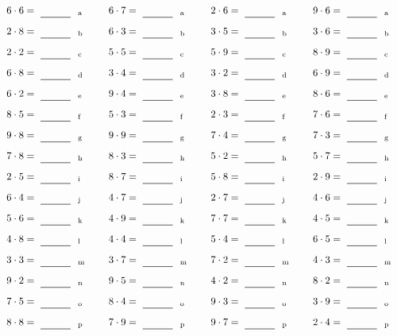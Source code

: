 \documentclass
[
  draft    = true,
  fontsize = 11pt,
  parskip  = half-
]
{scrartcl}
\begin{document}
\par\vfill\par
\begin{align*}
    \pline{6\cdot6}&=\rline{a}
  & \pline{6\cdot7}&=\rline{a}
  & \pline{2\cdot6}&=\rline{a}
  & \pline{9\cdot6}&=\rline{a} \\[1ex]
    \pline{2\cdot8}&=\rline{b}
  & \pline{6\cdot3}&=\rline{b}
  & \pline{3\cdot5}&=\rline{b}
  & \pline{3\cdot6}&=\rline{b} \\[1ex]
    \pline{2\cdot2}&=\rline{c}
  & \pline{5\cdot5}&=\rline{c}
  & \pline{5\cdot9}&=\rline{c}
  & \pline{8\cdot9}&=\rline{c} \\[1ex]
    \pline{6\cdot8}&=\rline{d}
  & \pline{3\cdot4}&=\rline{d}
  & \pline{3\cdot2}&=\rline{d}
  & \pline{6\cdot9}&=\rline{d} \\[1ex]
    \pline{6\cdot2}&=\rline{e}
  & \pline{9\cdot4}&=\rline{e}
  & \pline{3\cdot8}&=\rline{e}
  & \pline{8\cdot6}&=\rline{e} \\[1ex]
    \pline{8\cdot5}&=\rline{f}
  & \pline{5\cdot3}&=\rline{f}
  & \pline{2\cdot3}&=\rline{f}
  & \pline{7\cdot6}&=\rline{f} \\[1ex]
    \pline{9\cdot8}&=\rline{g}
  & \pline{9\cdot9}&=\rline{g}
  & \pline{7\cdot4}&=\rline{g}
  & \pline{7\cdot3}&=\rline{g} \\[1ex]
    \pline{7\cdot8}&=\rline{h}
  & \pline{8\cdot3}&=\rline{h}
  & \pline{5\cdot2}&=\rline{h}
  & \pline{5\cdot7}&=\rline{h} \\[1ex]
    \pline{2\cdot5}&=\rline{i}
  & \pline{8\cdot7}&=\rline{i}
  & \pline{5\cdot8}&=\rline{i}
  & \pline{2\cdot9}&=\rline{i} \\[1ex]
    \pline{6\cdot4}&=\rline{j}
  & \pline{4\cdot7}&=\rline{j}
  & \pline{2\cdot7}&=\rline{j}
  & \pline{4\cdot6}&=\rline{j} \\[1ex]
    \pline{5\cdot6}&=\rline{k}
  & \pline{4\cdot9}&=\rline{k}
  & \pline{7\cdot7}&=\rline{k}
  & \pline{4\cdot5}&=\rline{k} \\[1ex]
    \pline{4\cdot8}&=\rline{l}
  & \pline{4\cdot4}&=\rline{l}
  & \pline{5\cdot4}&=\rline{l}
  & \pline{6\cdot5}&=\rline{l} \\[1ex]
    \pline{3\cdot3}&=\rline{m}
  & \pline{3\cdot7}&=\rline{m}
  & \pline{7\cdot2}&=\rline{m}
  & \pline{4\cdot3}&=\rline{m} \\[1ex]
    \pline{9\cdot2}&=\rline{n}
  & \pline{9\cdot5}&=\rline{n}
  & \pline{4\cdot2}&=\rline{n}
  & \pline{8\cdot2}&=\rline{n} \\[1ex]
    \pline{7\cdot5}&=\rline{o}
  & \pline{8\cdot4}&=\rline{o}
  & \pline{9\cdot3}&=\rline{o}
  & \pline{3\cdot9}&=\rline{o} \\[1ex]
    \pline{8\cdot8}&=\rline{p}
  & \pline{7\cdot9}&=\rline{p}
  & \pline{9\cdot7}&=\rline{p}
  & \pline{2\cdot4}&=\rline{p}
\end{align*}
\end{document}

